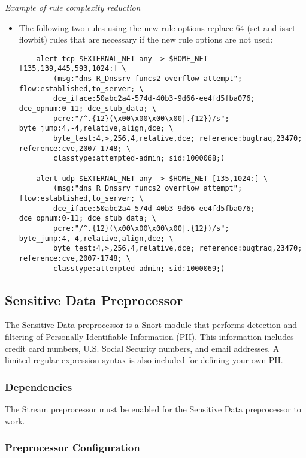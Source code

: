 \documentclass[english]{report}
\begin{document}
\textit{Example of rule complexity reduction}
\begin{itemize}

\item[] The following two rules using the new rule options replace 64 (set and
isset flowbit) rules that are necessary if the new rule options are not used:

\footnotesize
\begin{verbatim}
    alert tcp $EXTERNAL_NET any -> $HOME_NET [135,139,445,593,1024:] \
        (msg:"dns R_Dnssrv funcs2 overflow attempt"; flow:established,to_server; \
        dce_iface:50abc2a4-574d-40b3-9d66-ee4fd5fba076; dce_opnum:0-11; dce_stub_data; \
        pcre:"/^.{12}(\x00\x00\x00\x00|.{12})/s"; byte_jump:4,-4,relative,align,dce; \
        byte_test:4,>,256,4,relative,dce; reference:bugtraq,23470; reference:cve,2007-1748; \
        classtype:attempted-admin; sid:1000068;)

    alert udp $EXTERNAL_NET any -> $HOME_NET [135,1024:] \
        (msg:"dns R_Dnssrv funcs2 overflow attempt"; flow:established,to_server; \
        dce_iface:50abc2a4-574d-40b3-9d66-ee4fd5fba076; dce_opnum:0-11; dce_stub_data; \
        pcre:"/^.{12}(\x00\x00\x00\x00|.{12})/s"; byte_jump:4,-4,relative,align,dce; \
        byte_test:4,>,256,4,relative,dce; reference:bugtraq,23470; reference:cve,2007-1748; \
        classtype:attempted-admin; sid:1000069;)
\end{verbatim}
\normalsize
\end{itemize}

\subsection{Sensitive Data Preprocessor}
\label{sub:sensitive_data}

The Sensitive Data preprocessor is a Snort module that performs detection and
filtering of Personally Identifiable Information (PII). This information
includes credit card numbers, U.S. Social Security numbers, and email addresses.
A limited regular expression syntax is also included for defining your own PII.

\subsubsection{Dependencies}

The Stream preprocessor must be enabled for the Sensitive Data preprocessor
to work.

\subsubsection{Preprocessor Configuration}
\end{document}
